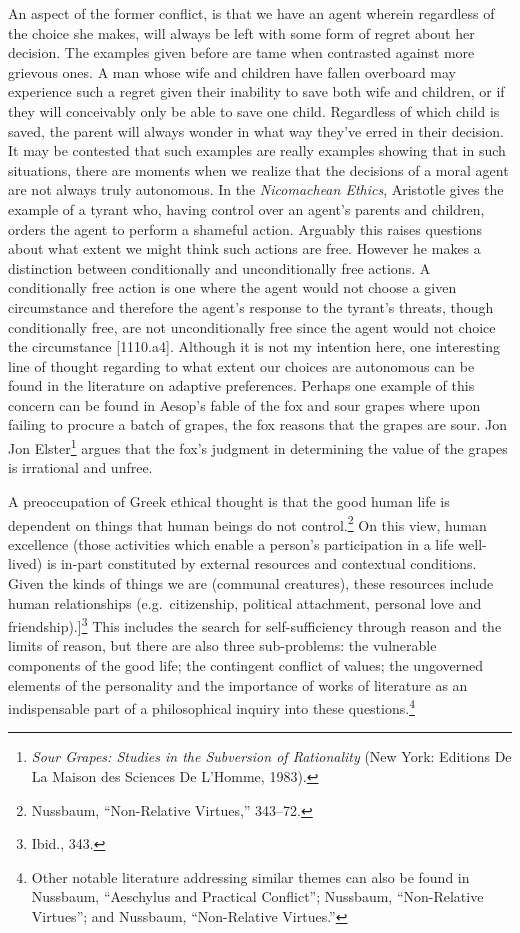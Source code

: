 \documentclass[phdthesis,12pt,final]{wuthesis}
\theoremstyle{definition}
\theoremstyle{definition}
\theoremstyle{definition}
\theoremstyle{definition}
\theoremstyle{remark}
\begin{document}
An aspect of the former conflict, is that we have an agent wherein regardless of the choice she makes, will always be left with some form of regret about her decision. The examples given before are tame when contrasted against more grievous ones. A man whose wife and children have fallen overboard may experience such a regret given their inability to save both wife and children, or if they will conceivably only be able to save one child. Regardless of which child is saved, the parent will always wonder in what way they've erred in their decision. It may be contested that such examples are really examples showing that in such situations, there are moments when we realize that the decisions of a moral agent are not always truly autonomous. In the \emph{Nicomachean Ethics}, Aristotle gives the example of a tyrant who, having control over an agent's parents and children, orders the agent to perform a shameful action. Arguably this raises questions about what extent we might think such actions are free. However he makes a distinction between conditionally and unconditionally free actions. A conditionally free action is one where the agent would not choose a given circumstance and therefore the agent's response to the tyrant's threats, though conditionally free, are not unconditionally free since the agent would not choice the circumstance {[}1110.a4{]}. Although it is not my intention here, one interesting line of thought regarding to what extent our choices are autonomous can be found in the literature on adaptive preferences. Perhaps one example of this concern can be found in Aesop's fable of the fox and sour grapes where upon failing to procure a batch of grapes, the fox reasons that the grapes are sour. Jon Jon Elster\footnote{\emph{Sour {Grapes}: {Studies} in the {Subversion} of {Rationality}} (New York: Editions De La Maison des Sciences De L'Homme, 1983).} argues that the fox's judgment in determining the value of the grapes is irrational and unfree.

A preoccupation of Greek ethical thought is that the good human life is dependent on things that human beings do not control.\footnote{Nussbaum, {``Non-Relative Virtues,''} 343--72.} On this view, human excellence (those activities which enable a person's participation in a life well-lived) is in-part constituted by external resources and contextual conditions. Given the kinds of things we are (communal creatures), these resources include human relationships (e.g.~citizenship, political attachment, personal love and friendship).{]}\footnote{Ibid., 343.} This includes the search for self-sufficiency through reason and the limits of reason, but there are also three sub-problems: the vulnerable components of the good life; the contingent conflict of values; the ungoverned elements of the personality and the importance of works of literature as an indispensable part of a philosophical inquiry into these questions.\footnote{Other notable literature addressing similar themes can also be found in Nussbaum, {``Aeschylus and Practical Conflict''}; Nussbaum, {``Non-Relative Virtues''}; and Nussbaum, {``Non-Relative Virtues.''}}
\end{document}

